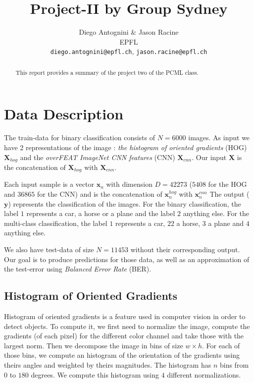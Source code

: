 \documentclass{article} %
\title{Project-II by Group Sydney}
\author{
Diego Antognini \& Jason Racine\\
EPFL \\
\texttt{diego.antognini@epfl.ch}, \texttt{jason.racine@epfl.ch} \\
}
\begin{document}
\maketitle

\begin{abstract}
This report provides a summary of the project two of the PCML class. 
\end{abstract}

\section{Data Description}

The train-data for binary classification consists of $N = 6000$ images. As input we have 2 representations of the image : \textit{the histogram of oriented gradients} (HOG) $\mathbf{X}_{hog}$ and the \textit{overFEAT ImageNet CNN features} (CNN) $\mathbf{X}_{cnn}$. Our input $\mathbf{X}$ is the concatenation of $\mathbf{X}_{hog}$ with $\mathbf{X}_{cnn}$. 

Each input sample is a vector $\mathbf{x}_n$ with dimension $D = 42273$ ($5408$ for the HOG and $36865$ for the CNN) and is the concatenation of $\mathbf{x}_n^{hog}$ with $\mathbf{x}_n^{cnn}$
The output ($\mathbf{y}$) represents the classification of the images. For the binary classification, the label $1$  represents a car, a horse or a plane and the label $2$ anything else. For the multi-class classification, the label $1$ represents a car, $2$2 a horse, $3$ a plane and $4$ anything else.

We also have test-data of size $N=11453$ without their corresponding output. Our goal is to produce predictions for those data, as well as an approximation of the test-error using \textit{Balanced Error Rate} (BER).

\subsection{Histogram of Oriented Gradients}

Histogram of oriented gradients is a feature used in computer vision in order to detect objects. To compute it, we first need to normalize the image, compute the gradients (of each pixel) for the different color channel and take those with the largest norm. Then we decompose the image in bins of size $w \times h$. For each of those bins, we compute an histogram of the orientation of the gradients using theirs angles and weighted by theirs magnitudes. The histogram has $n$ bins from $0$ to $180$ degrees. We compute this histogram using $4$ different normalizations.
\end{document}
